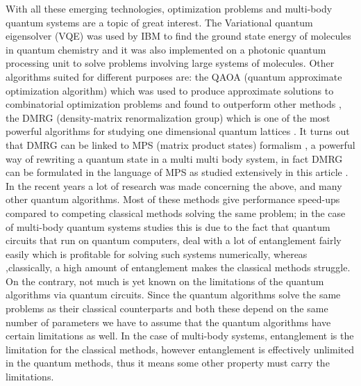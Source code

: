 \documentclass{physics_article}
\begin{document}
	With all these emerging technologies, optimization problems and multi-body quantum systems are a topic of great interest. The Variational quantum eigensolver (VQE) was used by IBM to find the ground state energy of molecules in  quantum chemistry \cite{kandala_mezzacapo_temme_takita_brink_chow_gambetta_2017} and it was also implemented on a photonic quantum processing unit \cite{peruzzo_mcclean_shadbolt_yung_zhou_love_aspuru-guzik_obrien_2014} to solve problems involving large systems of molecules. Other algorithms suited for different purposes are: the QAOA (quantum approximate optimization algorithm) which was used to produce approximate solutions to combinatorial optimization problems \cite{https://doi.org/10.48550/arxiv.1411.4028} and found to outperform other methods \cite{PhysRevX.10.021067}, the DMRG (density-matrix renormalization group) which is one of the most powerful algorithms for studying one dimensional quantum lattices \cite{schollwock_2005,hallberg_2006}. It turns out that DMRG can be linked to MPS (matrix product states) formalism \cite{https://doi.org/10.48550/arxiv.quant-ph/0608197}, a powerful way of rewriting a quantum state in a multi multi body system, in fact DMRG can be formulated in the language of MPS as studied extensively in this article \cite{schollwock_2011}. In the recent years a lot of research was made concerning the above, and many other quantum algorithms. Most of these methods give performance speed-ups compared to competing classical methods solving the same problem; in the case of multi-body quantum systems studies this is due to the fact that quantum circuits that run on quantum computers, deal with a lot of entanglement fairly easily which is profitable for solving such systems numerically, whereas ,classically, a high amount of entanglement makes the classical methods struggle. On the contrary, not much is yet known on the limitations of the quantum algorithms via quantum circuits. Since the quantum algorithms solve the same problems as their classical counterparts and both these depend on the same number of parameters we have to assume that the quantum algorithms have certain limitations as well. In the case of multi-body systems, entanglement is the limitation for the classical methods, however entanglement is effectively unlimited in the quantum methods, thus it means some other property must carry the limitations.  
\end{document}
